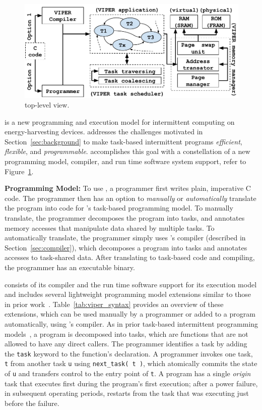 \begin{figure}
	\centering
	\includegraphics[width=\columnwidth]{figures/viper_block_diagram.pdf}
	\caption{\sys top-level view.}
	\label{fig:system_overview}
\end{figure}

\sys is a new programming and execution model for intermittent computing on energy-harvesting devices. \sys addresses the challenges motivated in Section~\ref{sec:background} to make task-based intermittent programs {\em efficient}, {\em flexible}, and {\em programmable}. \sys accomplishes this goal with a constellation of a new programming model, compiler, and run time software system support, refer to Figure~\ref{fig:system_overview}.

\textbf{\sys Programming Model:} To use \sys, a programmer first writes plain, imperative C code. The programmer then has an option to {\em manually} or {\em automatically} translate the program into code for \sys's task-based programming model. To manually translate, the programmer decomposes the program into tasks, and annotates memory accesses that manipulate data shared by multiple tasks. To automatically translate, the programmer simply uses \sys's compiler (described in Section~\ref{sec:compiler}), which decomposes a program into tasks and annotates accesses to task-shared data. After translating to task-based code and compiling, the programmer has an executable \sys binary.

\sys consists of its compiler and the run time software support for its execution model and includes several lightweight programming model extensions similar to those in prior work~\cite{chain,alpaca}. Table~\ref{tab:viper_syntax} provides an overview of these extensions, which can be used manually by a programmer or added to a program automatically, using \sys's compiler. As in prior task-based intermittent programming models~\cite{chain,alpaca}, a \sys program is decomposed into tasks, which are functions that are not allowed to have any direct callers. The programmer identifies a task by adding the {\tt task} keyword to the function's declaration. A programmer invokes one task, {\tt t} from another task {\tt u} using {\tt next\_task( t )}, which atomically commits the state of {\tt u} and transfers control to the entry point of {\tt t}. A program has a single {\em origin} task that executes first during the program's first execution; after a power failure, in subsequent operating periods, \sys restarts from the task that was executing just before the failure.

